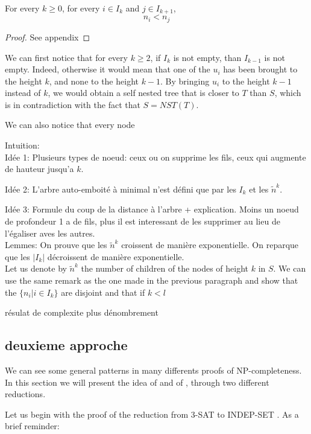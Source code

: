 \begin{lem}
  For every $k \geqslant 0$, for every $i \in I_{k}$ and $j \in
  I_{k+1}$,
  $$n_{i} < n_{j}$$
\begin{proof} See appendix
\end{proof}
\end{lem}
 

We can first notice that for every $k \geqslant 2$, if $I_{k}$ is not
empty, than $I_{k-1}$ is not empty. Indeed, otherwise it would mean
that one of the $u_{i}$ has been brought to the height $k$, and none to
the height $k-1$. By bringing $u_{i}$ to the height $k-1$ instead of $k$, we
would obtain a self nested tree that is closer to $T$ than $S$, which
is in contradiction with the fact that $S = NST(T)$.

We can also notice that every node 

Intuition:\\
Idée 1: Plusieurs types de noeud: ceux ou on supprime les fils, ceux
qui augmente de hauteur jusqu'a $k$.

Idée 2: L'arbre auto-emboité à minimal n'est défini que par les
$I_{k}$ et les $\tilde{n}^{k}$.

Idée 3:
Formule du coup de la distance à l'arbre + explication. 
Moins un noeud de profondeur 1 a de fils, plus il est
interessant de les supprimer au lieu de l'égaliser aves les autres.\\

Lemmes: On prouve que les $\tilde{n}^k$ croissent de manière
exponentielle. On reparque que les $|I_{k}|$ décroissent de manière exponentielle.\\ 

Let us denote by $\tilde{n}^{k}$ the number of children of the nodes
of height $k$ in $S$. We can use the same remark as the one made in the
previous paragraph and show that the $\{n_{i} | i \in I_{k} \}$ are
disjoint and that if $k < l$  

résulat de complexite plus dénombrement

\subsection{deuxieme approche}
We can see some general patterns in many differents proofs of
NP-completeness. In this section we will present the idea of \widgets
and of \constraints, through two different reductions.

Let us begin with the proof of the reduction from 3-SAT to INDEP-SET
\cite{polytech}. As a brief reminder:

